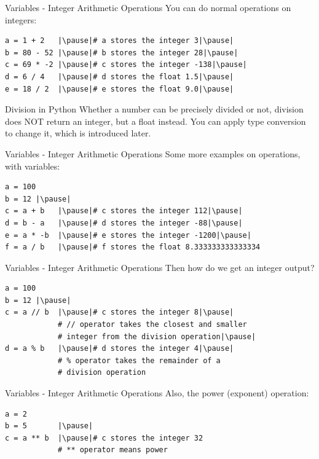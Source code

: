 \documentclass[dvipsnames, svgnames, x11names]{beamer}
\begin{document}
\begin{frame}[fragile]{Variables - Integer Arithmetic Operations}
You can do normal operations on integers:
\begin{verbatim}
a = 1 + 2   |\pause|# a stores the integer 3|\pause|
b = 80 - 52 |\pause|# b stores the integer 28|\pause|
c = 69 * -2 |\pause|# c stores the integer -138|\pause|
d = 6 / 4   |\pause|# d stores the float 1.5|\pause|
e = 18 / 2  |\pause|# e stores the float 9.0|\pause|
\end{verbatim}
\begin{alertblock}{Division in Python}
Whether a number can be precisely divided or not, division does NOT return an integer, but a float instead.
You can apply type conversion to change it, which is introduced later.
\end{alertblock}
\end{frame}

\begin{frame}[fragile]{Variables - Integer Arithmetic Operations}
Some more examples on operations, with variables:
\begin{verbatim}
a = 100
b = 12 |\pause|
c = a + b   |\pause|# c stores the integer 112|\pause|
d = b - a   |\pause|# d stores the integer -88|\pause|
e = a * -b  |\pause|# e stores the integer -1200|\pause|
f = a / b   |\pause|# f stores the float 8.333333333333334
\end{verbatim}
\end{frame}

\begin{frame}[fragile]{Variables - Integer Arithmetic Operations}
Then how do we get an integer output?\pause
\begin{verbatim}
a = 100
b = 12 |\pause|
c = a // b  |\pause|# c stores the integer 8|\pause|
            # // operator takes the closest and smaller 
            # integer from the division operation|\pause|
d = a % b   |\pause|# d stores the integer 4|\pause|
            # % operator takes the remainder of a 
            # division operation
\end{verbatim}
\end{frame}

\begin{frame}[fragile]{Variables - Integer Arithmetic Operations}
Also, the power (exponent) operation:
\begin{verbatim}
a = 2
b = 5       |\pause|
c = a ** b  |\pause|# c stores the integer 32
            # ** operator means power
\end{verbatim}
\end{frame}
\end{document}
